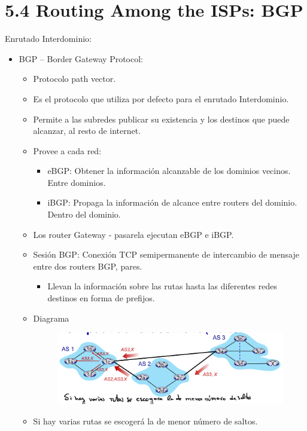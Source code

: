 \documentclass[12pt, twoside, openright]{report} %
\begin{document}
\pagebreak
\section{5.4 Routing Among the ISPs: BGP}

Enrutado Interdominio:

\begin{itemize}
	\item BGP -- Border Gateway Protocol:

	      \begin{itemize}
		      \item Protocolo path vector.
		      \item Es el protocolo que utiliza por defecto para el enrutado
		            Interdominio.
		      \item Permite a las subredes publicar su existencia y los destinos que
		            puede alcanzar, al resto de internet.
		      \item Provee a cada red:

		            \begin{itemize}
			            \item eBGP: Obtener la información alcanzable de los dominios
			                  vecinos. Entre dominios.
			            \item iBGP: Propaga la información de alcance entre routers del
			                  dominio. Dentro del dominio.
		            \end{itemize}
		      \item Los router Gateway - pasarela ejecutan eBGP e iBGP.
		      \item Sesión BGP: Conexión TCP semipermanente de intercambio de
		            mensaje entre dos routers BGP, pares.

		            \begin{itemize}
			            \item Llevan la información sobre las rutas hasta las diferentes
			                  redes destinos en forma de prefijos.
		            \end{itemize}
		      \item Diagrama
		            \begin{figure}[H]
			            {\includegraphics[scale=.15]{Untitled 45.png}}
		            \end{figure}
		      \item Si hay varias rutas se escogerá la de menor número de saltos.
	      \end{itemize}
\end{itemize}
\end{document}

